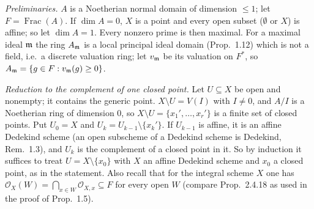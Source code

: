 \documentclass[11pt]{article}
\begin{document}
\pf
\emph{Preliminaries.} $A$ is a Noetherian normal domain of dimension $\le1$; let $F=\operatorname{Frac}(A)$. If $\dim A=0$, $X$ is a point and every open subset ($\emptyset$ or $X$) is affine; so let $\dim A=1$. Every nonzero prime is then maximal. For a maximal ideal $\mathfrak m$ the ring $A_\mathfrak m$ is a local principal ideal domain (Prop.~1.12) which is not a field, i.e.\ a discrete valuation ring; let $v_\mathfrak m$ be its valuation on $F^*$, so $A_\mathfrak m=\{g\in F:v_\mathfrak m(g)\ge0\}$.

\emph{Reduction to the complement of one closed point.} Let $U\subseteq X$ be open and nonempty; it contains the generic point. $X\setminus U=V(I)$ with $I\neq0$, and $A/I$ is a Noetherian ring of dimension $0$, so $X\setminus U=\{x_1',\dots,x_r'\}$ is a finite set of closed points. Put $U_0=X$ and $U_k=U_{k-1}\setminus\{x_k'\}$. If $U_{k-1}$ is affine, it is an affine Dedekind scheme (an open subscheme of a Dedekind scheme is Dedekind, Rem.~1.3), and $U_k$ is the complement of a closed point in it. So by induction it suffices to treat $U=X\setminus\{x_0\}$ with $X$ an affine Dedekind scheme and $x_0$ a closed point, as in the statement. Also recall that for the integral scheme $X$ one has $\mathcal O_X(W)=\bigcap_{x\in W}\mathcal O_{X,x}\subseteq F$ for every open $W$ (compare Prop.~2.4.18 as used in the proof of Prop.~1.5).
\end{document}
